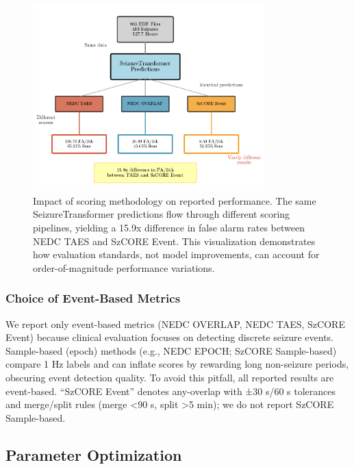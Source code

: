 \documentclass[
]{article}
\begin{document}
\begin{figure}
\hypertarget{fig:scoring-impact}{%
\centering
\includegraphics[width=0.8\textwidth,height=\textheight]{figures/output/arxiv/FIGURE_2_scoring_impact.pdf}
\caption{Impact of scoring methodology on reported performance. The same
SeizureTransformer predictions flow through different scoring pipelines,
yielding a 15.9x difference in false alarm rates between NEDC TAES and
SzCORE Event. This visualization demonstrates how evaluation standards,
not model improvements, can account for order-of-magnitude performance
variations.}\label{fig:scoring-impact}
}
\end{figure}

\hypertarget{choice-of-event-based-metrics}{%
\subsubsection{Choice of Event-Based
Metrics}\label{choice-of-event-based-metrics}}

We report only event-based metrics (NEDC OVERLAP, NEDC TAES, SzCORE
Event) because clinical evaluation focuses on detecting discrete seizure
events. Sample-based (epoch) methods (e.g., NEDC EPOCH; SzCORE
Sample-based) compare 1 Hz labels and can inflate scores by rewarding
long non-seizure periods, obscuring event detection quality. To avoid
this pitfall, all reported results are event-based. ``SzCORE Event''
denotes any-overlap with ±30 s/60 s tolerances and merge/split rules
(merge \textless90 s, split \textgreater5 min); we do not report SzCORE
Sample-based.

\hypertarget{parameter-optimization}{%
\subsection{Parameter Optimization}\label{parameter-optimization}}
\end{document}
